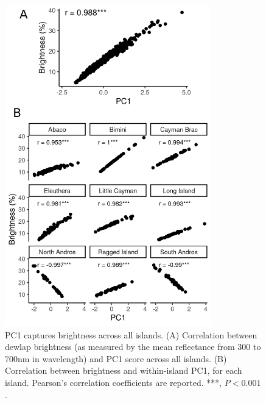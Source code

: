 \begin{figure}[H]
	\centering
	\includegraphics[width=0.8\textwidth]{figures/brightness.png}
	\caption{PC1 captures brightness across all islands. (A) Correlation between dewlap brightness (as measured by the mean reflectance from 300 to 700nm in wavelength) and PC1 score across all islands. (B) Correlation between brightness and within-island PC1, for each island. Pearson's correlation coefficients are reported. ***, $P < 0.001$.}
	\label{fig:brightness}
\end{figure}
